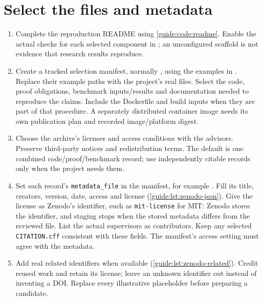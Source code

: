 \section{Select the files and metadata}
\begin{enumerate}
  \item Complete the reproduction README using \cref{guide:code:readme}. Enable the actual checks for each selected component in ; an unconfigured scaffold is not evidence that research results reproduce.
  \item Create a tracked selection manifest, normally , using the examples in . Replace their example paths with the project's real files. Select the code, proof obligations, benchmark inputs/results and documentation needed to reproduce the claims. Include the Dockerfile and build inputs when they are part of that procedure. A separately distributed container image needs its own publication plan and recorded image/platform digest.
  \item Choose the archive's licenses and access conditions with the advisors. Preserve third-party notices and redistribution terms. The default is one combined code/proof/benchmark record; use independently citable records only when the project needs them.
  \item Set each record's \texttt{metadata\_file} in the manifest, for example . Fill its title, creators, version, date, access and license (\cref{guide:lst:zenodo-json}). Give the license as Zenodo's identifier, such as \texttt{mit-license} for MIT: Zenodo stores the identifier, and staging stops when the stored metadata differs from the reviewed file. List the actual supervisors as contributors. Keep any selected \texttt{CITATION.cff} consistent with these fields. The manifest's access setting must agree with the metadata.
  \item Add real related identifiers when available (\cref{guide:lst:zenodo-related}). Credit reused work and retain its license; leave an unknown identifier out instead of inventing a DOI. Replace every illustrative placeholder before preparing a candidate.
\end{enumerate}

